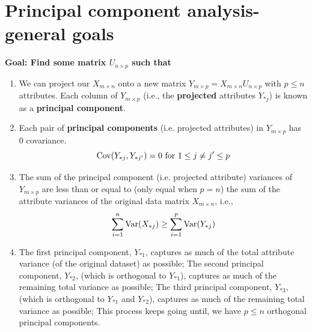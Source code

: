 \documentclass[11pt]{elegantbook}
\begin{document}
\section{Principal component analysis- general goals}
\textbf{Goal: Find some matrix $U_{n\times p}$ such that}
\begin{enumerate}
    \item We can project our $X_{m\times n}$ onto a new matrix $Y_{m\times p}=X_{m\times n}U_{n\times p}$ with $p\leq n$ attributes. Each column of $Y_{m\times p}$ (i.e., the \textbf{projected} attributes $Y_{*j}$) is known as a \textbf{principal component}.
    \item Each pair of \textbf{principal components} (i.e. projected attributes) in $Y_{m\times p}$ has $0$ covariance. $$\textnormal{Cov}(Y_{*j},Y_{*j'})=0 \textnormal{ for }1\leq j\neq j'\leq p$$
    \item The sum of the principal component (i.e. projected attribute) variances of $Y_{m\times p}$ are
    less than or equal to (only equal when $p=n$) the sum of the attribute variances of the original data matrix $X_{m\times n}$, i.e.,
    \begin{equation}
        \begin{aligned}
            \sum_{i=1}^n \textnormal{Var}(X_{*j})\geq \sum_{i=1}^p \textnormal{Var}(Y_{*j})
        \end{aligned}
        \nonumber
    \end{equation}
    \item The first principal component, $Y_{*1}$, captures as much of the total attribute variance (of the original dataset) as possible; The second principal component, $Y_{*2}$, (which is orthogonal to $Y_{*1}$), captures as much of the remaining total variance as possible; The third principal component, $Y_{*3}$, (which is orthogonal to $Y_{*1}$ and $Y_{*2}$), captures as much of the remaining total variance as possible; This process keeps going until, we have $p\leq n$ orthogonal principal components.
\end{enumerate}
\end{document}
